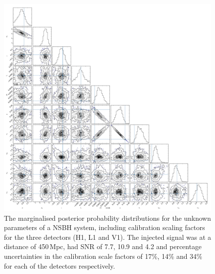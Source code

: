 \documentclass[10pt]{iopart}
\begin{document}
\begin{figure}
 \begin{center}
  \includegraphics[width=1.0\textwidth]{nsbh_post_fig.pdf}
 \end{center}
 \caption{\label{fig:nsbhpost} The marginalised posterior probability distributions for the unknown
 parameters of a \ac{NSBH} system, including calibration scaling factors for the three detectors 
(H1, L1 and V1). The injected signal was at a distance of 450\,Mpc, had \ac{SNR} of 7.7, 10.9 and 
4.2 and percentage uncertainties in the calibration scale factors of 17\%, 14\% and 34\% for each of 
the detectors respectively.}
\end{figure}
\end{document}
